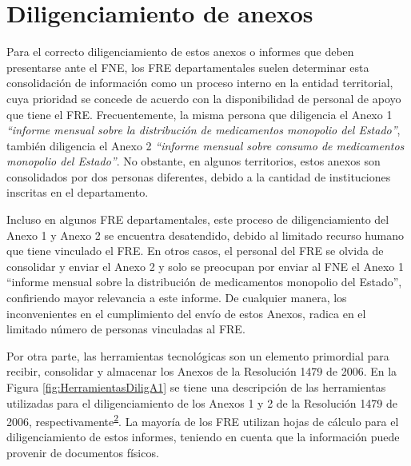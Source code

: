 \documentclass[
]{book}
\begin{document}
\hypertarget{diligenciamiento-de-anexos}{%
\section{Diligenciamiento de anexos}\label{diligenciamiento-de-anexos}}

Para el correcto diligenciamiento de estos anexos o informes que deben presentarse ante el FNE, los FRE departamentales suelen determinar esta consolidación de información como un proceso interno en la entidad territorial, cuya prioridad se concede de acuerdo con la disponibilidad de personal de apoyo que tiene el FRE. Frecuentemente, la misma persona que diligencia el Anexo 1 \emph{``informe mensual sobre la distribución de medicamentos monopolio del Estado''}, también diligencia el Anexo 2 \emph{``informe mensual sobre consumo de medicamentos monopolio del Estado''}. No obstante, en algunos territorios, estos anexos son consolidados por dos personas diferentes, debido a la cantidad de instituciones inscritas en el departamento.

Incluso en algunos FRE departamentales, este proceso de diligenciamiento del Anexo 1 y Anexo 2 se encuentra desatendido, debido al limitado recurso humano que tiene vinculado el FRE. En otros casos, el personal del FRE se olvida de consolidar y enviar el Anexo 2 y solo se preocupan por enviar al FNE el Anexo 1 ``informe mensual sobre la distribución de medicamentos monopolio del Estado'', confiriendo mayor relevancia a este informe. De cualquier manera, los inconvenientes en el cumplimiento del envío de estos Anexos, radica en el limitado número de personas vinculadas al FRE.

Por otra parte, las herramientas tecnológicas son un elemento primordial para recibir, consolidar y almacenar los Anexos de la Resolución 1479 de 2006. En la Figura \ref{fig:HerramientasDiligA1} se tiene una descripción de las herramientas utilizadas para el diligenciamiento de los Anexos 1 y 2 de la Resolución 1479 de 2006, respectivamente\textsuperscript{\protect\hyperlink{ref-MSPS1479-2006}{2}}. La mayoría de los FRE utilizan hojas de cálculo para el diligenciamiento de estos informes, teniendo en cuenta que la información puede provenir de documentos físicos.
\end{document}
